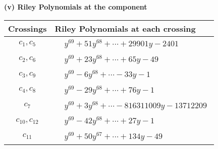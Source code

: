 \documentclass[1p]{elsarticle_modified}
\theoremstyle{definition}
\begin{document}
\newpage\renewcommand{\arraystretch}{1}
\flushleft \textbf{(v) Riley Polynomials at the component}\newline \\
\begin{tabular}{m{50pt}|m{274pt}}
Crossings & \hspace{64pt}Riley Polynomials at each crossing \\
\hline $$\begin{aligned}c_{1},c_{5}\end{aligned}$$&$\begin{aligned}
&y^{69}+51 y^{68}+\cdots+29901 y-2401
\end{aligned}$\\
\hline $$\begin{aligned}c_{2},c_{6}\end{aligned}$$&$\begin{aligned}
&y^{69}+23 y^{68}+\cdots+65 y-49
\end{aligned}$\\
\hline $$\begin{aligned}c_{3},c_{9}\end{aligned}$$&$\begin{aligned}
&y^{69}-6 y^{68}+\cdots-33 y-1
\end{aligned}$\\
\hline $$\begin{aligned}c_{4},c_{8}\end{aligned}$$&$\begin{aligned}
&y^{69}-29 y^{68}+\cdots+76 y-1
\end{aligned}$\\
\hline $$\begin{aligned}c_{7}\end{aligned}$$&$\begin{aligned}
&y^{69}+3 y^{68}+\cdots-816311009 y-13712209
\end{aligned}$\\
\hline $$\begin{aligned}c_{10},c_{12}\end{aligned}$$&$\begin{aligned}
&y^{69}-42 y^{68}+\cdots+27 y-1
\end{aligned}$\\
\hline $$\begin{aligned}c_{11}\end{aligned}$$&$\begin{aligned}
&y^{69}+50 y^{67}+\cdots+134 y-49
\end{aligned}$\\
\hline
\end{tabular}\\~\\
\end{document}
